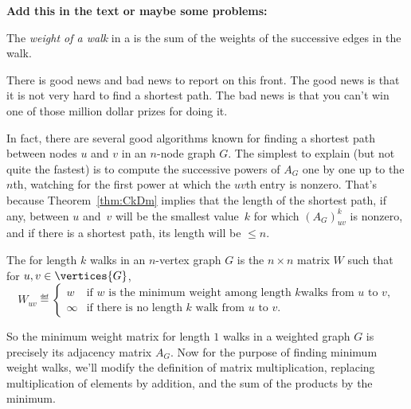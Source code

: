 \begin{editingnotes}
\textbf{Add this in the text or maybe some problems:}

\begin{definition}\label{def:5H}
  The \emph{weight of a walk}  in a  is the sum of the weights of
  the successive edges in the walk.
\end{definition}

There is good news and bad news to report on this front.  The good
news is that it is not very hard to find a shortest path.  The bad
news is that you can't win one of those million dollar prizes for
doing it.

In fact, there are several good algorithms known for finding a shortest
path between nodes $u$ and $v$ in an $n$-node graph $G$.  The simplest to
explain (but not quite the fastest) is to compute  the successive powers of $A_G$ one by one up
to the $n$th, watching for the first power at which the $uv$th entry is
nonzero.  That's because Theorem~\ref{thm:CkDm} implies that the length of
the shortest path, if any, between $u$ and~$v$ will be the smallest
value~$k$ for which $(A_G)_{uv}^k$ is nonzero, and if there is a shortest
path, its length will be $\leq n$.

\begin{definition}
  The  for length $k$ walks in an $n$-vertex
  graph $G$ is the $n \times n$ matrix $W$ such that for $u,v \in \vertices{G}$,
\begin{equation}\label{def:weight_matrix}
W_{uv} \eqdef
\begin{cases} w & \text{if $w$ is the minimum weight among length $k$
                            walks from $u$ to $v$},\\
              \infty & \text{if there is no length $k$ walk from $u$ to $v$}.
\end{cases}
\end{equation}
\end{definition}

So the minimum weight matrix for length $1$ walks in a weighted graph $G$
is precisely its adjacency matrix $A_G$.  Now for the purpose of finding
minimum weight walks, we'll modify the definition of matrix
multiplication, replacing multiplication of elements by addition, and the
sum of the products by the minimum.



\end{editingnotes}
